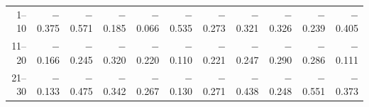 \begin{tabular}{rrrrrrrrrrr}
\toprule
1--10 & \ensuremath{-}0.375 & \ensuremath{-}0.571 & \ensuremath{-}0.185 & \ensuremath{-}0.066 & \ensuremath{-}0.535 & \ensuremath{-}0.273 & \ensuremath{-}0.321 & \ensuremath{-}0.326 & \ensuremath{-}0.239 & \ensuremath{-}0.405 \\
11--20 & \ensuremath{-}0.166 & \ensuremath{-}0.245 & \ensuremath{-}0.320 & \ensuremath{-}0.220 & \ensuremath{-}0.110 & \ensuremath{-}0.221 & \ensuremath{-}0.247 & \ensuremath{-}0.290 & \ensuremath{-}0.286 & \ensuremath{-}0.111 \\
21--30 & \ensuremath{-}0.133 & \ensuremath{-}0.475 & \ensuremath{-}0.342 & \ensuremath{-}0.267 & \ensuremath{-}0.130 & \ensuremath{-}0.271 & \ensuremath{-}0.438 & \ensuremath{-}0.248 & \ensuremath{-}0.551 & \ensuremath{-}0.373 \\
\bottomrule
\end{tabular}
